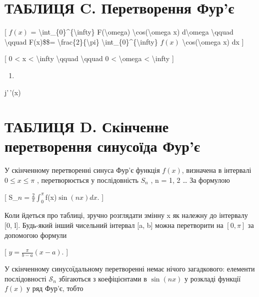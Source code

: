 \documentclass[
]{article}
\providecommand{\tightlist}{%
  \setlength{\itemsep}{0pt}\setlength{\parskip}{0pt}}
\begin{document}
{{{\section{ТАБЛИЦЯ C. Перетворення
Фур'є}\label{ux442ux430ux431ux43bux438ux446ux44f-c.-ux43fux435ux440ux435ux442ux432ux43eux440ux435ux43dux43dux44f-ux444ux443ux440ux454}

{[} \(f(x)\) = \textbackslash int\_\{0\}\^{}\{\textbackslash infty\}
F(\textbackslash omega) \textbackslash cos(\textbackslash omega x)
d\textbackslash omega \textbackslash qquad \textbackslash qquad
F(x)\$\$= \textbackslash frac\{2\}\{\textbackslash pi\}
\textbackslash int\_\{0\}\^{}\{\textbackslash infty\} \(f(x)\)
\textbackslash cos(\textbackslash omega x) dx {]}

{[} 0 \textless{} x \textless{} \textbackslash infty
\textbackslash qquad \textbackslash qquad 0 \textless{}
\textbackslash omega \textless{} \textbackslash infty {]}

\begin{enumerate}
\def\labelenumi{\arabic{enumi}.}
\tightlist
\item
\end{enumerate}

j'\,'(x)

\section{ТАБЛИЦЯ D. Скінченне перетворення синусоїда
Фур'є}\label{ux442ux430ux431ux43bux438ux446ux44f-d.-ux441ux43aux456ux43dux447ux435ux43dux43dux435-ux43fux435ux440ux435ux442ux432ux43eux440ux435ux43dux43dux44f-ux441ux438ux43dux443ux441ux43eux457ux434ux430-ux444ux443ux440ux454}

У скінченному перетворенні синуса Фур'є функція \(f(x)\), визначена в
інтервалі \(0 \le x \le \pi\) , перетворюється у послідовність \(S_n\) ,
n = 1, 2 \ldots{} За формулою

{[} S\_\(n = \frac{2}{\pi} \int_0^{\pi}\)f(x)\(\sin(nx) dx\). {]}

Коли йдеться про таблиці, зручно розглядати змінну x як належну до
інтервалу {[}0, l{]}. Будь-який інший чисельний інтервал {[}a, b{]}
можна перетворити на \([0, \pi]\) за допомогою формули

{[} \(y = \frac{\pi}{b - a} (x - a)\). {]}

У скінченному синусоїдальному перетворенні немає нічого загадкового:
елементи послідовності \(\mathcal{S}_n\) збігаються з коефіцієнтами в
\(\sin(nx)\) у розкладі функції \(f(x)\) у ряд Фур'є, тобто

}}}
\end{document}
